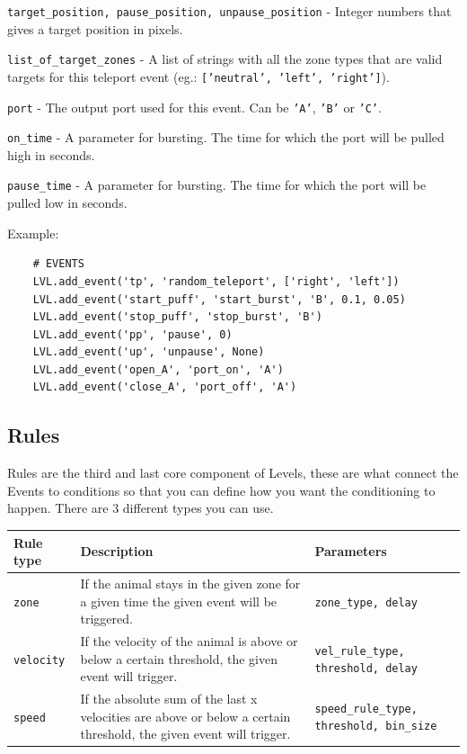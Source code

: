 \documentclass[11pt,a4paper]{article}
\newcommand{\param}[1]{\item \texttt{#1} -}
\begin{document}
\begin{paramlist}
\param{target\_position, pause\_position, unpause\_position} Integer numbers that gives a target position in pixels.
\param{list\_of\_target\_zones} A list of strings with all the zone types that are valid targets for this teleport event (eg.: \texttt{['neutral', 'left', 'right']}).
\param{port} The output port used for this event. Can be \texttt{'A'}, \texttt{'B'} or \texttt{'C'}.
\param{on\_time} A parameter for bursting. The time for which the port will be pulled high in seconds.
\param{pause\_time} A parameter for bursting. The time for which the port will be pulled low in seconds.
\end{paramlist}


Example:
\begin{lstlisting}
	# EVENTS
	LVL.add_event('tp', 'random_teleport', ['right', 'left'])
	LVL.add_event('start_puff', 'start_burst', 'B', 0.1, 0.05)
	LVL.add_event('stop_puff', 'stop_burst', 'B')
	LVL.add_event('pp', 'pause', 0)
	LVL.add_event('up', 'unpause', None)
	LVL.add_event('open_A', 'port_on', 'A')
	LVL.add_event('close_A', 'port_off', 'A')
\end{lstlisting}

\subsection{Rules}
Rules are the third and last core component of Levels, these are what connect the Events to conditions so that you can define how you want the conditioning to happen. There are 3 different types you can use.\\


\begin{tabularx}{\textwidth}{|p{3.1cm}|X|p{4cm}|}
\hline 
\rule[-1ex]{0pt}{2.5ex} 
Rule type & Description & Parameters \\ 

\hline 
\rule[-1ex]{0pt}{2.5ex} 
\texttt{zone} & If the animal stays in the given zone for a given time the given event will be triggered. & \texttt{zone\_type, delay} \\ 

\hline 
\rule[-1ex]{0pt}{2.5ex} 
\texttt{velocity} & If the velocity of the animal is above or below a certain threshold, the given event will trigger. & \texttt{vel\_rule\_type, threshold, delay} \\ 

\hline 
\rule[-1ex]{0pt}{2.5ex} 
\texttt{speed} & If the absolute sum of the last x velocities are above or below a certain threshold, the given event will trigger. & \texttt{speed\_rule\_type, threshold, bin\_size} \\ 

\hline 
\end{tabularx}
\\
\end{document}
